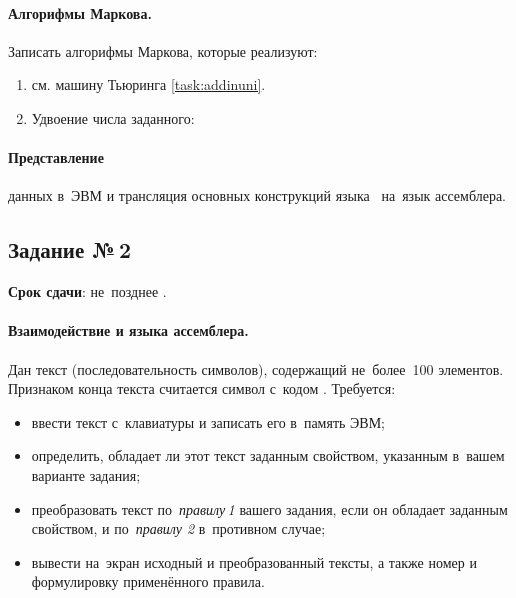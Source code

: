 \documentclass[a4paper,11pt,landscape,notitlepage,oneside,openany,final]{memoir}
\begin{document}
\paragraph{Алгорифмы Маркова.}
Записать алгорифмы Маркова, которые реализуют:
\begin{enumerate}
    \item см. машину Тьюринга \ref{task:addinuni}.
    \item Удвоение числа заданного:
\end{enumerate}

\paragraph{Представление}
данных в~ЭВМ и трансляция основных конструкций языка~ на~язык ассемблера.



\subsection{Задание №\,2}
\textbf{Срок сдачи}: не~позднее . %


\paragraph{Взаимодействие  и языка ассемблера.}
Дан текст (последовательность символов), содержащий не~более~100 элементов. Признаком конца текста считается символ с~кодом . Требуется:
\begin{itemize}
    \item ввести текст с~клавиатуры и записать его в~память ЭВМ;
    \item определить, обладает ли этот текст заданным свойством, указанным в~вашем варианте задания;
    \item преобразовать текст по~\emph{правилу\,1} вашего задания, если он обладает заданным свойством, и по~\emph{правилу 2} в~противном случае;
    \item вывести на~экран исходный и преобразованный тексты, а также номер и формулировку применённого правила.
\end{itemize}
\end{document}
